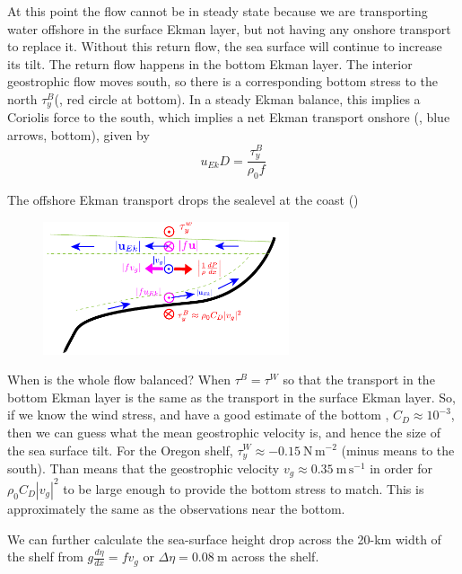 At this point the flow cannot be in steady state because we are transporting water offshore in the surface Ekman layer, but not having any onshore transport to replace it.  Without this return flow, the sea surface will continue to increase its tilt.  The return flow happens in the bottom Ekman layer.  The interior geostrophic flow moves south, so there is a corresponding bottom stress to the north $\tau_y^B$(, red circle at bottom).  In a steady Ekman balance, this implies a Coriolis force to the south, which implies a net Ekman transport onshore (, blue arrows, bottom), given by 
\begin{equation}
  u_{Ek}D = \frac{\tau_y^B}{\rho_0 f}
\end{equation}

The offshore Ekman transport drops the sealevel at the coast ()
\begin{figure}[hbt]
  \begin{center}
    \includegraphics[width=2.85in]{figs/Geostrophic/CoastalStep3}
    \caption{}
    \label{fig:CoastalStep3}  
  \end{center}
\end{figure}

When is the whole flow balanced?  When $\tau^B = \tau^W$ so that the transport in the bottom Ekman layer is the same as the transport in the surface Ekman layer.  So, if we know the wind stress, and have a good estimate of the bottom , $C_D\approx10^{-3}$, then we can guess what the mean geostrophic velocity is, and hence the size of the sea surface tilt.  For the Oregon shelf, $\tau_y^W\approx -0.15\ \mathrm{N\,m^{-2}}$ (minus means to the south).  Than means that the geostrophic velocity $v_g \approx 0.35\ \mathrm{m\,s^{-1}}$ in order for $\rho_0 C_D |v_g|^2$ to be large enough to provide the bottom stress to match.  This is approximately the same as the observations near the bottom.  

We can further calculate the sea-surface height drop across the 20-km width of the shelf from $g \frac{d\eta}{dx} = f v_g$ or $\Delta \eta =  0.08\ \mathrm{m}$ across the shelf.  

